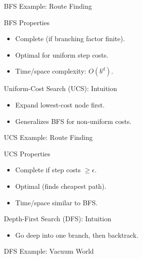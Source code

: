 \documentclass[aspectratio=169]{beamer}
\begin{document}
\begin{frame}{BFS Example: Route Finding}
\end{frame}

\begin{frame}{BFS Properties}
  \begin{itemize}
    \item Complete (if branching factor finite).
    \item Optimal for uniform step costs.
    \item Time/space complexity: $O(b^{d})$.
  \end{itemize}
\end{frame}

\begin{frame}{Uniform-Cost Search (UCS): Intuition}
  \begin{itemize}
    \item Expand lowest-cost node first.
    \item Generalizes BFS for non-uniform costs.
  \end{itemize}
\end{frame}

\begin{frame}{UCS Example: Route Finding}
\end{frame}

\begin{frame}{UCS Properties}
  \begin{itemize}
    \item Complete if step costs $\geq \epsilon$.
    \item Optimal (finds cheapest path).
    \item Time/space similar to BFS.
  \end{itemize}
\end{frame}

\begin{frame}{Depth-First Search (DFS): Intuition}
  \begin{itemize}
    \item Go deep into one branch, then backtrack.
  \end{itemize}
\end{frame}

\begin{frame}{DFS Example: Vacuum World}
\end{frame}
\end{document}
